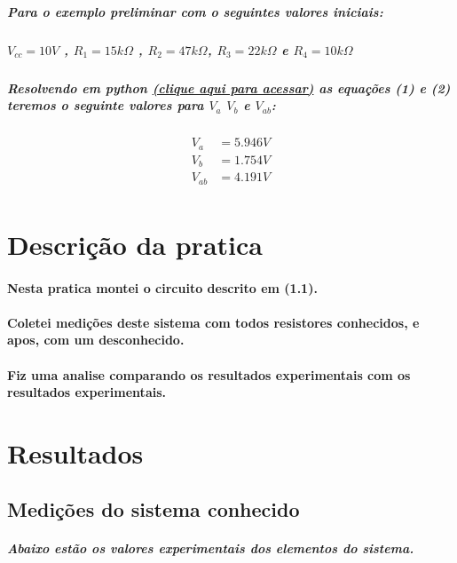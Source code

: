 \documentclass[12pt,twoside, a4paper, twocolumn]{article}
\begin{document}
\subparagraph*{Para o exemplo preliminar com o seguintes valores iniciais: }
\subparagraph*{$V_{cc} = 10V$ , $R_1 = 15k\varOmega$ , $R_2 = 47k\varOmega$, $R_3 = 22k\varOmega$ e $R_4 = 10k\varOmega$}

\subparagraph*{Resolvendo em python \href{https://www.online-python.com/AkfwEsRGU9}{(clique aqui para acessar)} as equações (1) e (2) teremos o seguinte valores para $V_{a}$  $V_b$ e $V_{ab}$:}

\begin{equation*}
    \begin{aligned}
        V_{a}  & = 5.946V \\
        V_{b}  & = 1.754V \\
        V_{ab} & = 4.191V \\
    \end{aligned}
\end{equation*}


\section{Descrição da pratica}

\paragraph*{Nesta pratica montei o circuito descrito em (1.1). }

\paragraph*{Coletei medições deste sistema com todos resistores conhecidos, e apos, com um desconhecido.}
\paragraph*{Fiz uma analise comparando os resultados experimentais com os resultados experimentais.}



\section{Resultados}

\subsection{Medições do sistema conhecido}

\subparagraph*{Abaixo estão os valores experimentais dos elementos do sistema.}
\end{document}
